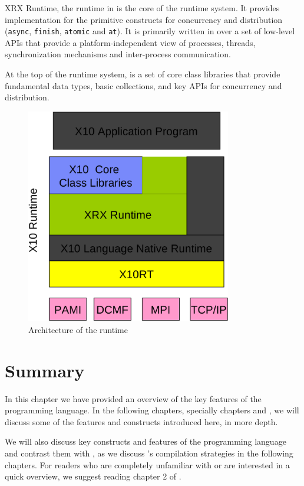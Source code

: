 XRX Runtime, the \xten runtime in \xten is the core of the \xten runtime system.
It provides implementation for the primitive \xten constructs for concurrency
and distribution (\texttt{async}, \texttt{finish}, \texttt{atomic} and
\texttt{at}). It is primarily written in \xten over a set of low-level APIs that
provide a platform-independent view of processes, threads, synchronization
mechanisms and inter-process communication. 

At the top of the \xten runtime system, is a set of core
class libraries that provide fundamental data types, basic collections, and key
APIs for concurrency and distribution.   

\begin{figure}[p]
    \centering
    \includegraphics[width=0.8\textwidth]{Figures/x10runtime.eps}
    \caption{Architecture of the \xten runtime}
    \label{fig:x10runtime}
\end{figure}

\section{Summary}

In this chapter we have provided an overview of the key features of the \xten
programming language. In the following chapters, specially chapters
 and , we will discuss some of the
features and constructs introduced here, in more depth. 

We will also discuss key constructs and features of the \matlab
programming language and contrast them with \xten, as we discuss \mixten's
compilation strategies in the following chapters. For readers who are completely
unfamiliar with \matlab or are interested in a quick overview, we suggest
reading chapter 2 of \cite{AntonThesis}.
   
